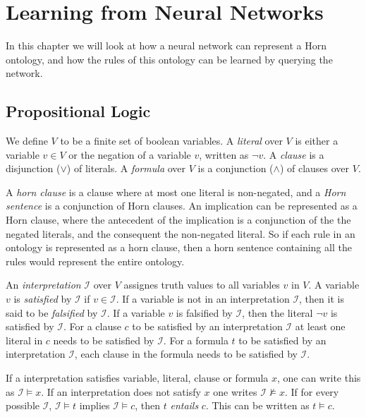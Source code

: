 \chapter{Learning from Neural Networks}

In this chapter we will look at how a neural network can represent a Horn ontology, and how the rules of this ontology can be learned by querying the network.

\section{Propositional Logic}
We define $V$ to be a finite set of boolean variables. A \emph{literal} over $V$ is either a variable $v \in V$ or the negation of a variable $v$, written as $\neg v$. A \emph{clause} is a disjunction ($\vee$) of literals. A \emph{formula} over $V$ is a conjunction ($\wedge$) of clauses over $V$.

A \emph{horn clause} is a clause where at most one literal is non-negated, and a \emph{Horn sentence} is a conjunction of Horn clauses. An implication can be represented as a Horn clause, where the antecedent of the implication is a conjunction of the the negated literals, and the consequent the non-negated literal. So if each rule in an ontology is represented as a horn clause, then a horn sentence containing all the rules would represent the entire ontology.

An \emph{interpretation} $\mathcal{I}$ over $V$ assignes truth values to all variables $v$ in $V$. A variable $v$ is \emph{satisfied} by $\mathcal{I}$ if $v \in \mathcal{I}$. If a variable is not in an interpretation $\mathcal{I}$, then it is said to be \emph{falsified} by $\mathcal{I}$. If a variable $v$ is falsified by $\mathcal{I}$, then the literal $\neg v$ is satisfied by $\mathcal{I}$. For a clause $c$ to be satisfied by an interpretation $\mathcal{I}$ at least one literal in $c$ needs to be satisfied by $\mathcal{I}$. For a formula $t$ to be satisfied by an interpretation $\mathcal{I}$, each clause in the formula needs to be satisfied by $\mathcal{I}$.

If a interpretation satisfies variable, literal, clause or formula $x$, one can write this as $\mathcal{I} \models x$. If an interpretation does not satisfy $x$ one writes $\mathcal{I} \not \models x $. If for every possible $\mathcal{I}$, $\mathcal{I} \models t$ implies $\mathcal{I} \models c$, then $t$ \emph{entails} $c$. This can be written as $t \models c$.


